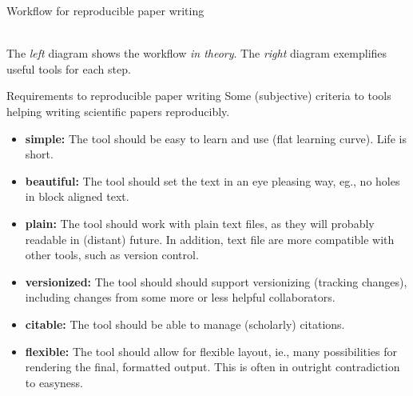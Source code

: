 \documentclass[final,hyperref={pdfpagelabels=false}]{beamer}
\begin{document}
\begin{frame}{}
\begin{columns}[t]
\begin{column}{.48\linewidth}
\begin{block}{Workflow for reproducible paper writing}
\begin{minipage}[t]{0.50\textwidth}
     \end{minipage}	
     \\
    The \emph{left} diagram shows the workflow \emph{in theory}. The \emph{right} diagram exemplifies useful tools for each step.      
    \end{block}





        \begin{block}{Requirements to reproducible paper writing}
        Some (subjective) criteria to tools helping writing scientific papers reproducibly.
          \begin{itemize}
          \item \textbf{simple:} The tool should be easy to learn and use (flat learning curve). Life is short.
          \item \textbf{beautiful:} The tool should set the text in an eye pleasing way, eg., no holes in block aligned text.
	   \item \textbf{plain:} The tool should work with plain text files, as they will probably readable in (distant) future. In addition, text file are more compatible with other tools, such as version control. 
         \item \textbf{versionized:} The tool should should support versionizing (tracking changes), including changes from some more or less helpful collaborators.
         \item \textbf{citable:} The tool should be able to manage (scholarly) citations.
         \item \textbf{flexible:} The tool should allow for flexible layout, ie., many possibilities for rendering the final, formatted output. This is often in outright contradiction to easyness.
	

\end{itemize}
\end{block}
\end{column}
\end{columns}
\end{frame}
\end{document}
